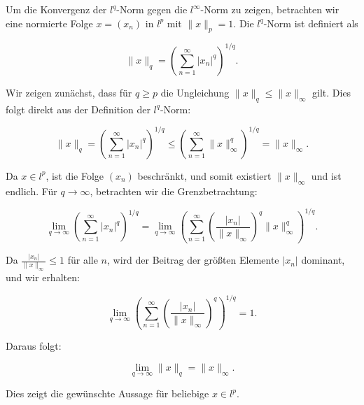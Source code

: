 Um die Konvergenz der \( l^q \)-Norm gegen die \( l^\infty \)-Norm zu zeigen, betrachten wir eine normierte Folge \( x = (x_n) \) in \( l^p \) mit \( \|x\|_p = 1 \). Die \( l^q \)-Norm ist definiert als 

\[
\|x\|_q = \left( \sum_{n=1}^{\infty} |x_n|^q \right)^{1/q}.
\]

Wir zeigen zunächst, dass für \( q \geq p \) die Ungleichung \( \|x\|_q \leq \|x\|_\infty \) gilt. Dies folgt direkt aus der Definition der \( l^q \)-Norm:

\[
\|x\|_q = \left( \sum_{n=1}^{\infty} |x_n|^q \right)^{1/q} \leq \left( \sum_{n=1}^{\infty} \|x\|_\infty^q \right)^{1/q} = \|x\|_\infty.
\]

Da \( x \in l^p \), ist die Folge \( (x_n) \) beschränkt, und somit existiert \( \|x\|_\infty \) und ist endlich. Für \( q \to \infty \), betrachten wir die Grenzbetrachtung:

\[
\lim_{q \to \infty} \left( \sum_{n=1}^{\infty} |x_n|^q \right)^{1/q} = \lim_{q \to \infty} \left( \sum_{n=1}^{\infty} \left( \frac{|x_n|}{\|x\|_\infty} \right)^q \|x\|_\infty^q \right)^{1/q}.
\]

Da \( \frac{|x_n|}{\|x\|_\infty} \leq 1 \) für alle \( n \), wird der Beitrag der größten Elemente \( |x_n| \) dominant, und wir erhalten:

\[
\lim_{q \to \infty} \left( \sum_{n=1}^{\infty} \left( \frac{|x_n|}{\|x\|_\infty} \right)^q \right)^{1/q} = 1.
\]

Daraus folgt:

\[
\lim_{q \to \infty} \|x\|_q = \|x\|_\infty.
\]

Dies zeigt die gewünschte Aussage für beliebige \( x \in l^p \).

